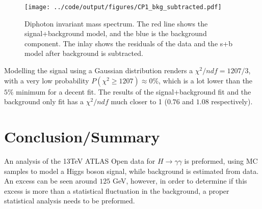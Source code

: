 \documentclass[10pt, aps, twocolumn, a4paper, nofootinbib]{revtex4}
\begin{document}
\begin{figure}[H]
\texttt{[image: ../code/output/figures/CP1\_bkg\_subtracted.pdf]}
\caption{Diphoton invariant mass spectrum. The red line shows the signal+background model, and the blue is the background component. The inlay shows the residuals of the data and the s+b model after background is subtracted. \label{fig:bkgsub_CP1}}
\end{figure}

Modelling the signal using a Gaussian distribution renders a $\chi^2/ndf = 1207/3$, with a very low probability $P(\chi^2\geq 1207) \approx 0\%$, which is a lot lower than the $5\%$ minimum for a decent fit. The results of the signal+background fit and the background only fit has a $\chi^2/ndf$ much closer to 1 ($0.76$ and $1.08$ respectively).

\section{Conclusion/Summary}

An analysis of the 13TeV ATLAS Open data for $H\rightarrow \gamma\gamma$ is preformed, using MC samples to model a Higgs boson signal, while background is estimated from data. An excess can be seen around $125$ GeV, however, in order to determine if this excess is more than a statistical fluctuation in the background, a proper statistical analysis needs to be preformed.

\newpage

\end{document}
